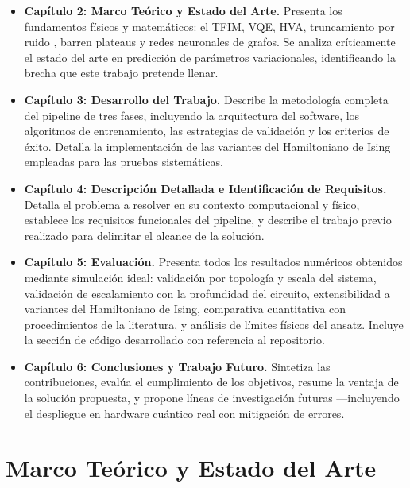 \documentclass[11pt,a4paper,spanish]{book}
\begin{document}
\begin{itemize}
    \item \textbf{Capítulo 2: Marco Teórico y Estado del Arte.} Presenta los fundamentos físicos y matemáticos: el TFIM, VQE, HVA, truncamiento por ruido \citep{mele2026}, barren plateaus y redes neuronales de grafos. Se analiza críticamente el estado del arte en predicción de parámetros variacionales, identificando la brecha que este trabajo pretende llenar.

    \item \textbf{Capítulo 3: Desarrollo del Trabajo.} Describe la metodología completa del pipeline de tres fases, incluyendo la arquitectura del software, los algoritmos de entrenamiento, las estrategias de validación y los criterios de éxito. Detalla la implementación de las variantes del Hamiltoniano de Ising empleadas para las pruebas sistemáticas.

    \item \textbf{Capítulo 4: Descripción Detallada e Identificación de Requisitos.} Detalla el problema a resolver en su contexto computacional y físico, establece los requisitos funcionales del pipeline, y describe el trabajo previo realizado para delimitar el alcance de la solución.

    \item \textbf{Capítulo 5: Evaluación.} Presenta todos los resultados numéricos obtenidos mediante simulación ideal: validación por topología y escala del sistema, validación de escalamiento con la profundidad del circuito, extensibilidad a variantes del Hamiltoniano de Ising, comparativa cuantitativa con procedimientos de la literatura, y análisis de límites físicos del ansatz. Incluye la sección de código desarrollado con referencia al repositorio.

    \item \textbf{Capítulo 6: Conclusiones y Trabajo Futuro.} Sintetiza las contribuciones, evalúa el cumplimiento de los objetivos, resume la ventaja de la solución propuesta, y propone líneas de investigación futuras ---incluyendo el despliegue en hardware cuántico real con mitigación de errores.
\end{itemize}



\chapter{Marco Teórico y Estado del Arte}
\end{document}
